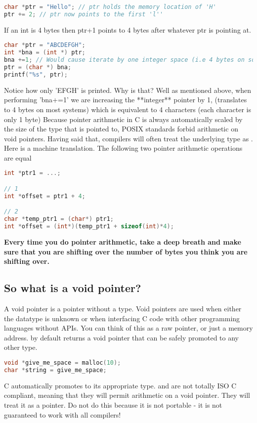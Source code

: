 \begin{lstlisting}[language=C]
char *ptr = "Hello"; // ptr holds the memory location of 'H'
ptr += 2; // ptr now points to the first 'l''
\end{lstlisting}

If an int is 4 bytes then ptr+1 points to 4 bytes after whatever ptr is pointing at.

\begin{lstlisting}[language=C]
char *ptr = "ABCDEFGH";
int *bna = (int *) ptr;
bna +=1; // Would cause iterate by one integer space (i.e 4 bytes on some systems)
ptr = (char *) bna;
printf("%s", ptr);
\end{lstlisting}

Notice how only 'EFGH' is printed.
Why is that? Well as mentioned above, when performing 'bna+=1' we are increasing the **integer** pointer by 1, (translates to 4 bytes on most systems) which is equivalent to 4 characters (each character is only 1 byte)
Because pointer arithmetic in C is always automatically scaled by the size of the type that is pointed to, POSIX standards forbid arithmetic on void pointers.
Having said that, compilers will often treat the underlying type as .
Here is a machine translation.
The following two pointer arithmetic operations are equal

\begin{lstlisting}[language=C]
int *ptr1 = ...;

// 1
int *offset = ptr1 + 4;

// 2
char *temp_ptr1 = (char*) ptr1;
int *offset = (int*)(temp_ptr1 + sizeof(int)*4);
\end{lstlisting}

\textbf{Every time you do pointer arithmetic, take a deep breath and make sure that you are shifting over the number of bytes you think you are shifting over.}

\subsection{So what is a void pointer?}

A void pointer is a pointer without a type.
Void pointers are used when either the datatype is unknown or when interfacing C code with other programming languages without APIs.
You can think of this as a raw pointer, or just a memory address.
 by default returns a void pointer that can be safely promoted to any other type.

\begin{lstlisting}[language=C]
void *give_me_space = malloc(10);
char *string = give_me_space;
\end{lstlisting}

C automatically promotes  to its appropriate type.
 and  are not totally ISO C compliant, meaning that they will permit arithmetic on a void pointer.
They will treat it as a  pointer.
Do not do this because it is not portable - it is not guaranteed to work with all compilers!

